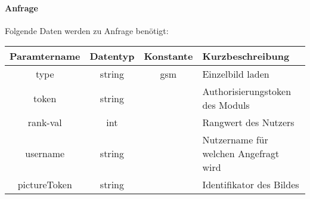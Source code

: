 \paragraph{Anfrage}Folgende Daten werden zu Anfrage benötigt:
\begin{table}[H]
	\begin{tabular}{|c|c|c|p{6.5cm}|}
		\hline
		\textbf{Paramtername} & \textbf{Datentyp} & \textbf{Konstante} & \textbf{Kurzbeschreibung}                                                                                               \\ \hline
		type                & string            & gsm                & Einzelbild laden \\ \hline
		token               & string            &                    & Authorisierungstoken des Moduls \\ \hline
		rank-val            & int               &                    & Rangwert des Nutzers \\ \hline
		username            & string            &                    & Nutzername für welchen Angefragt wird \\ \hline
		pictureToken        & string            &                    & Identifikator des Bildes \\ \hline
	\end{tabular}
\end{table}
